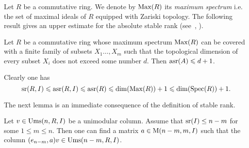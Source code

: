 Let $R$ be a commutative ring. We denote by $\operatorname{Max}(R)$ its \emph{maximum spectrum} i.e. the set of maximal ideals of $R$ equipped with Zariski topology.
The following result gives an upper estimate for the absolute stable rank (see~\cite[Theorem~2.3]{EO}, \cite[Theorem~3.7]{MKV}).
\begin{thm}
Let $R$ be a commutative ring whose maximum spectrum $\operatorname{Max}(R)$ can be covered with a finite family of subsets $X_1\ldots, X_m$ such that the topological dimension of every subset $X_i$ does not exceed some number $d$. Then $\operatorname{asr}(A)\leqslant d+1$.
\end{thm}
Clearly one has
\[ \operatorname{sr}(R,I)\leqslant\operatorname{asr}(R,I)\leqslant\operatorname{asr}(R)\leqslant \dim(\operatorname{Max}(R))+1\leqslant\dim(\operatorname{Spec}(R))+1. \]

The next lemma is an immediate consequence of the definition of stable rank.
\begin{lemma}\label{lemma:srUnip} Let $v\in\operatorname{Ums}(n, R, I)$ be a unimodular column. Assume that $\operatorname{sr}(I)\leq n-m$ for some $1\leq m \leq n$.
Then one can find a matrix $a\in \operatorname{M}(n-m,m,I)$ such that the column $(e_{n-m},a)v\in \operatorname{Ums}(n-m, R, I)$. \end{lemma} 

